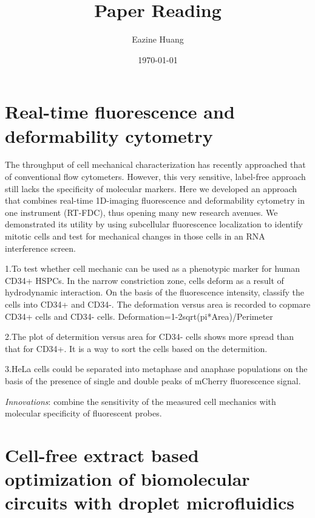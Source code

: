 \documentclass{article}
\begin{document}
\title{Paper Reading}
\author{Eazine Huang}
\date{\today}
\maketitle

\part{Real-time fluorescence and deformability cytometry}

The throughput of cell mechanical characterization has recently approached that of conventional flow cytometers. However, this very sensitive, label-free approach still lacks the specificity of molecular markers. Here we developed an approach that combines real-time 1D-imaging fluorescence and deformability cytometry in one instrument (RT-FDC), thus opening many new research avenues. We demonstrated its utility by using subcellular fluorescence localization to identify mitotic cells and test for mechanical changes in those cells in an RNA interference screen.


1.To test whether cell mechanic can be used as a phenotypic marker for human CD34+ HSPCs. In the narrow constriction zone, cells deform as a result of hydrodynamic interaction. On the basis of the fluorescence intensity, classify the cells into CD34+ and CD34-. The deformation versus area is recorded to copmare CD34+ cells and CD34- cells.
Deformation=1-2sqrt(pi*Area)/Perimeter

2.The plot of determition versus area for CD34- cells shows more spread than that for CD34+.
It is a way to sort the cells based on the determition.


3.HeLa cells could be separated into metaphase and anaphase populations on the basis of the presence of single and double peaks of mCherry fluorescence signal.

\emph{Innovations}: combine the sensitivity of the measured cell mechanics with molecular specificity of fluorescent probes.

\part{Cell-free extract based optimization of biomolecular circuits with droplet microfluidics}
\end{document}
